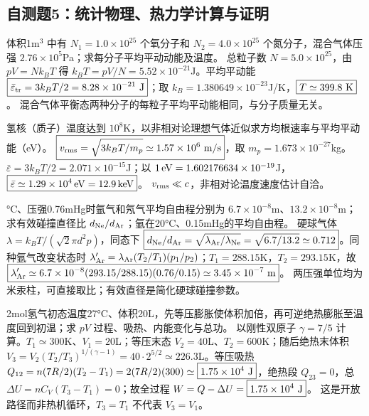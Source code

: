 \subsection{自测题5：统计物理、热力学计算与证明}

\problemtext 体积1m$^3$ 中有 $N_1=1.0\times10^{25}$ 个氧分子和 $N_2=4.0\times10^{25}$ 个氮分子，混合气体压强 $2.76\times10^5$Pa；求每分子平均平动动能及温度。
\workings 总粒子数 $N=5.0\times10^{25}$，由 $pV=Nk_BT$ 得 $k_BT=pV/N=5.52\times10^{-21}$J。平均平动能 $\boxed{\bar\varepsilon_{\rm tr}=3k_BT/2=8.28\times10^{-21}\ {\rm J}}$；取 $k_B=1.380649\times10^{-23}$J/K，$\boxed{T\simeq399.8\ {\rm K}}$。
\crosscheck 混合气体平衡态两种分子的每粒子平均平动能相同，与分子质量无关。

\problemtext 氢核（质子）温度达到 $10^8$K，以非相对论理想气体近似求方均根速率与平均平动能（eV）。
\workings $\boxed{v_{\rm rms}=\sqrt{3k_BT/m_p}\simeq1.57\times10^6\ {\rm m/s}}$，取 $m_p=1.673\times10^{-27}$kg。$\bar\varepsilon=3k_BT/2=2.071\times10^{-15}$J；以 $1\,{\rm eV}=1.602176634\times10^{-19}$J，$\boxed{\bar\varepsilon\simeq1.29\times10^4\,{\rm eV}=12.9\,{\rm keV}}$。
\crosscheck $v_{\rm rms}\ll c$，非相对论温度速度估计自洽。

°C、压强0.76mHg时氩气和氖气平均自由程分别为 $6.7\times10^{-8}$m、$13.2\times10^{-8}$m；求有效碰撞直径比 $d_{\rm Ne}/d_{\rm Ar}$；氩在20°C、0.15mHg的平均自由程。
\workings 硬球气体 $\lambda=k_BT/(\sqrt2\pi d^2p)$，同态下 $\boxed{d_{\rm Ne}/d_{\rm Ar}=\sqrt{\lambda_{\rm Ar}/\lambda_{\rm Ne}}=\sqrt{6.7/13.2}\simeq0.712}$。同种氩气改变状态时 $\lambda'_{{\rm Ar}}=\lambda_{\rm Ar}(T_2/T_1)(p_1/p_2)$；$T_1=288.15$K，$T_2=293.15$K，故 $\boxed{\lambda'_{{\rm Ar}}\simeq6.7\times10^{-8}(293.15/288.15)(0.76/0.15)\simeq3.45\times10^{-7}\ {\rm m}}$。
\crosscheck 两压强单位均为米汞柱，可直接取比；有效直径是简化硬球碰撞参数。

\problemtext 2mol氢气初态温度27°C、体积20L，先等压膨胀使体积加倍，再可逆绝热膨胀至温度回到初温；求 $pV$ 过程、吸热、内能变化与总功。
\workings 以刚性双原子 $\gamma=7/5$ 计算。$T_1\simeq300$K、$V_1=20$L；等压末态 $V_2=40$L、$T_2=600$K；随后绝热末体积 $V_3=V_2(T_2/T_3)^{1/(\gamma-1)}=40\cdot2^{5/2}\simeq226.3$L。等压吸热 $Q_{12}=n(7R/2)(T_2-T_1)=2(7R/2)(300)\simeq\boxed{1.75\times10^4\ {\rm J}}$，绝热段 $Q_{23}=0$，总 $\Delta U=nC_V(T_3-T_1)=\boxed{0}$；故全过程 $W=Q-\Delta U=\boxed{1.75\times10^4\ {\rm J}}$。
\crosscheck 这是开放路径而非热机循环，$T_3=T_1$ 不代表 $V_3=V_1$。

